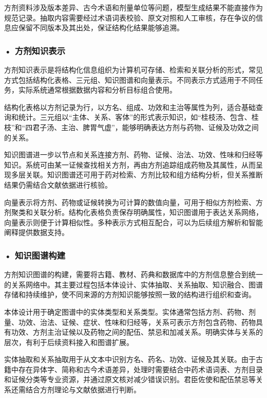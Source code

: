 方剂资料涉及版本差异、古今术语和剂量单位等问题，模型生成结果不能直接作为规范记录。抽取内容需要经过术语词表校验、原文对照和人工审核，存在争议的信息应保留不同版本及其出处，保证结构化结果能够追溯。

\subsubsection*{\textbf{• 方剂知识表示}}

方剂知识表示是将结构化信息组织为计算机可存储、检索和关联分析的形式，常见方式包括结构化表格、三元组、知识图谱和向量表示。不同表示方式适用于不同任务，实际系统通常根据数据内容和分析目标组合使用。

结构化表格以方剂记录为行，以方名、组成、功效和主治等属性为列，适合基础查询和统计。三元组以“主体、关系、客体”的形式表示知识，如“桂枝汤、包含、桂枝”和“四君子汤、主治、脾胃气虚”，能够明确表达方剂与药物、证候及功效之间的关系。

知识图谱进一步以节点和关系连接方剂、药物、证候、治法、功效、性味和归经等知识。系统可由某一证候查找相关方剂，再由方剂追踪组成药物及其属性，从而呈现多层关联。知识图谱还可用于药对检索、方剂比较和组方结构分析，但关系推断结果仍需结合文献依据进行核验。

向量表示将方剂、药物或证候转换为可计算的数值向量，可用于相似方剂检索、方剂聚类和关联分析。结构化表格负责保存明确属性，知识图谱用于表达关系网络，向量表示则便于计算相似性。多种表示方式相互配合，可以为后续组方解析和智能阐释提供数据支持。


\subsubsection*{\textbf{• 知识图谱构建}}

方剂知识图谱的构建，需要将古籍、教材、药典和数据库中的方剂信息整合到统一的关系网络中。其主要过程包括本体设计、实体抽取、关系抽取、知识融合、图谱存储和持续维护，使不同来源的方剂知识能够按照一致的结构进行组织和查询。

本体设计用于确定图谱中的实体类型和关系类型。实体通常包括方剂、药物、剂量、功效、治法、证候、症状、性味和归经等，关系可表示方剂包含药物、药物具有功效、方剂主治证候以及药物之间的配伍、禁忌和加减关系。明确实体与关系的层次，有利于后续资料接入和图谱扩展。

实体抽取和关系抽取用于从文本中识别方名、药名、功效、证候及其关联。由于古籍中存在异体字、简称和古今术语差异，处理时需要结合中药术语词表、方剂目录和证候分类等专业资源，并通过原文核对减少错误识别。君臣佐使和配伍禁忌等关系还需结合方剂理论与文献依据进行判断。

